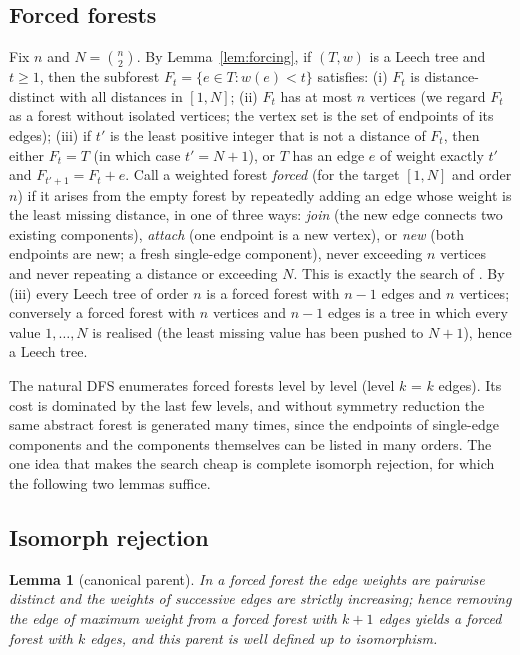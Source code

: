 \documentclass[11pt,a4paper]{article}
\theoremstyle{plain}
\newtheorem{lemma}[theorem]{Lemma}
\theoremstyle{remark}
\newcommand{\bin}[2]{\binom{#1}{#2}}
\begin{document}
\subsection{Forced forests}\label{sec:forced}

Fix $n$ and $N=\bin n2$.  By Lemma~\ref{lem:forcing}, if $(T,w)$ is a Leech tree
and $t\ge 1$, then the subforest $F_t=\{e\in T:w(e)<t\}$ satisfies:
(i) $F_t$ is distance-distinct with all distances in $[1,N]$;
(ii) $F_t$ has at most $n$ vertices (we regard $F_t$ as a forest without
isolated vertices; the vertex set is the set of endpoints of its edges);
(iii) if $t'$ is the least positive integer that is not a distance of $F_t$, then
either $F_t=T$ (in which case $t'=N+1$), or $T$ has an edge $e$ of weight exactly
$t'$ and $F_{t'+1}=F_t+e$.
Call a weighted forest \emph{forced} (for the target $[1,N]$ and order $n$) if it
arises from the empty forest by repeatedly adding an edge whose weight is the
least missing distance, in one of three ways: \emph{join} (the new edge connects
two existing components), \emph{attach} (one endpoint is a new vertex), or
\emph{new} (both endpoints are new; a fresh single-edge component), never
exceeding $n$ vertices and never repeating a distance or exceeding $N$.  This is
exactly the search of \cite[Alg.~2.7]{Calhoun2007}.  By (iii) every Leech tree
of order $n$ is a forced forest with $n-1$ edges and $n$ vertices; conversely a
forced forest with $n$ vertices and $n-1$ edges is a tree in which every value
$1,\dots,N$ is realised (the least missing value has been pushed to $N+1$),
hence a Leech tree.

The natural DFS enumerates forced forests level by level (level $k$ = $k$
edges).  Its cost is dominated by the last few levels, and without symmetry
reduction the same abstract forest is generated many times, since the endpoints
of single-edge components and the components themselves can be listed in many
orders.  The one idea that makes the search cheap is complete isomorph
rejection, for which the following two lemmas suffice.

\subsection{Isomorph rejection}\label{sec:isomorph}

\begin{lemma}[canonical parent]\label{lem:parent}
In a forced forest the edge weights are pairwise distinct and the weights of
successive edges are strictly increasing; hence removing the edge of maximum
weight from a forced forest with $k+1$ edges yields a forced forest with $k$
edges, and this parent is well defined up to isomorphism.
\end{lemma}
\end{document}
